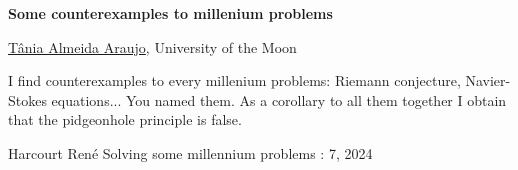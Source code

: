 \documentclass[a4paper, 11pt]{article}
\newcommand{\abstracttitle}[1]{{
    \centering
    \LARGE \textbf{#1}\\
    \vspace*{0.7cm}
}}
\newcommand{\firstauthor}[2]{{
    \centering
    \underline{#1}, \textsf{#2}\\
    \vspace*{0.25cm}
}}
\newcommand{\abstracttext}[1]{
    \vspace{0.6cm}
    #1
}
\begin{document}
\abstracttitle{Some counterexamples to millenium problems}

\firstauthor{Tânia Almeida Araujo}{University of the Moon}

\abstracttext{
    I find counterexamples to every millenium problems: Riemann conjecture, Navier-Stokes equations... You named them. As a corollary to all them together I obtain that the pidgeonhole principle is false.
}

\begin{thebibliography}{9}
Harcourt René
\newblock Solving some millennium problems
: 7, 2024
\end{thebibliography}
\end{document}
